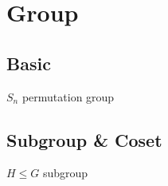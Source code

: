 \chapter{Group}

\section{Basic}

\begin{definition}[group]
\end{definition}

\begin{proposition}[2nd definition]
\end{proposition}

\begin{proposition}[3rd definition]
\end{proposition}

\begin{definition}
\end{definition}

\begin{definition}
\end{definition}

\begin{definition}
\end{definition}

\begin{notation}
$S_n$ permutation group
\end{notation}

\begin{definition}
\end{definition}

\section{Subgroup \& Coset}

\begin{definition}[subgroup]
\end{definition}

\begin{notation}
$H \leq G$ subgroup
\end{notation}

\begin{proposition}
\end{proposition}

